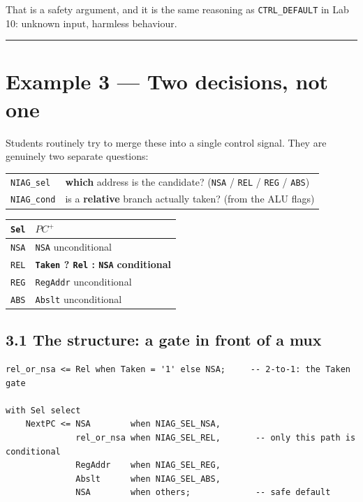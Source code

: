 \documentclass[11pt]{article}
\newcommand{\code}[1]{\texttt{#1}}
\newcommand{\hr}{\vspace{2pt}\hrule\vspace{6pt}}
\begin{document}
That is a safety argument, and it is the same reasoning as \code{CTRL\_DEFAULT} in
Lab 10: unknown input, harmless behaviour.

\vspace{4pt}\hr

\section*{Example 3 --- Two decisions, not one}

Students routinely try to merge these into a single control signal. They are
genuinely two separate questions:

\begin{center}
\begin{tabular}{ll}
\toprule
\code{NIAG\_sel} & \textbf{which} address is the candidate? (\code{NSA} / \code{REL} / \code{REG} / \code{ABS}) \\
\code{NIAG\_cond} & is a \textbf{relative} branch actually taken? (from the ALU flags) \\
\bottomrule
\end{tabular}
\end{center}

\begin{center}
\begin{tabular}{ll}
\toprule
\code{Sel} & $PC^{+}$ \\
\midrule
\code{NSA} & \code{NSA} \hfill unconditional \\
\code{REL} & \textbf{\code{Taken} ? \code{Rel} : \code{NSA}} \hfill \textbf{conditional} \\
\code{REG} & \code{RegAddr} \hfill unconditional \\
\code{ABS} & \code{Abslt} \hfill unconditional \\
\bottomrule
\end{tabular}
\end{center}

\subsection*{3.1 The structure: a gate in front of a mux}

\begin{lstlisting}
rel_or_nsa <= Rel when Taken = '1' else NSA;     -- 2-to-1: the Taken gate

with Sel select
    NextPC <= NSA        when NIAG_SEL_NSA,
              rel_or_nsa when NIAG_SEL_REL,       -- only this path is conditional
              RegAddr    when NIAG_SEL_REG,
              Abslt      when NIAG_SEL_ABS,
              NSA        when others;             -- safe default
\end{lstlisting}
\end{document}
